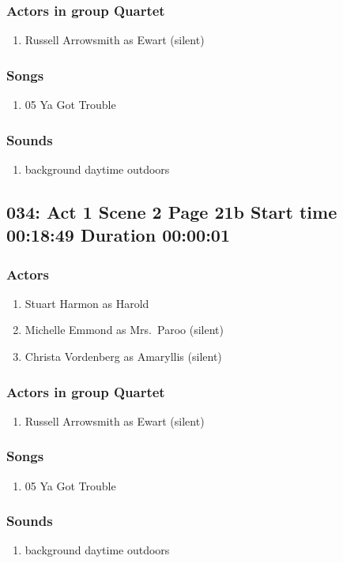 \subsubsection{Actors in group Quartet}
\begin{enumerate}
\item Russell Arrowsmith as Ewart (silent)
\end{enumerate}

\subsubsection{Songs}
\begin{enumerate}
\item 05 Ya Got Trouble
\end{enumerate}\subsubsection{Sounds}
\begin{enumerate}
\item background daytime outdoors
\end{enumerate}
\subsection{034: Act 1 Scene 2 Page 21b Start time 00:18:49 Duration 00:00:01}

\subsubsection{Actors}
\begin{enumerate}
\item Stuart Harmon as Harold
\item Michelle Emmond as Mrs.~Paroo (silent)
\item Christa Vordenberg as Amaryllis (silent)
\end{enumerate}
\subsubsection{Actors in group Quartet}
\begin{enumerate}
\item Russell Arrowsmith as Ewart (silent)
\end{enumerate}

\subsubsection{Songs}
\begin{enumerate}
\item 05 Ya Got Trouble
\end{enumerate}\subsubsection{Sounds}
\begin{enumerate}
\item background daytime outdoors
\end{enumerate}
